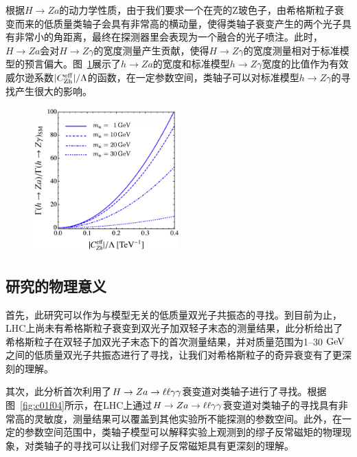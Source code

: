 根据$H\rightarrow Za$的动力学性质，由于我们要求一个在壳的Z玻色子，由希格斯粒子衰变而来的低质量类轴子会具有非常高的横动量，使得类轴子衰变产生的两个光子具有非常小的角距离，最终在探测器里会表现为一个融合的光子喷注。此时，$H\rightarrow Za$会对$H\rightarrow Z\gamma$的宽度测量产生贡献，使得$H\rightarrow Z\gamma$的宽度测量相对于标准模型的预言偏大。图~\ref{fig:c01f06}展示了$h \rightarrow Z a$的宽度和标准模型$h \rightarrow Z \gamma$宽度的比值作为有效威尔逊系数$|C_{\mathrm{Zh}}^{\mathrm{eff}}|/\Lambda$的函数，在一定参数空间，类轴子可以对标准模型$h \rightarrow Z \gamma$的寻找产生很大的影响。

\begin{figure}[!htbp]
    \centering
    \includegraphics[width=0.5\textwidth]{figures/chapter01/ALP_GammaRatio.jpg}
    \label{fig:c01f06}
\end{figure}

\subsection{研究的物理意义}

首先，此研究可以作为与模型无关的低质量双光子共振态的寻找。到目前为止，LHC上尚未有希格斯粒子衰变到双光子加双轻子末态的测量结果，此分析给出了希格斯粒子在双轻子加双光子末态下的首次测量结果，并对质量范围为1--30$\GeV$之间的低质量双光子共振态进行了寻找，让我们对希格斯粒子的奇异衰变有了更深刻的理解。

其次，此分析首次利用了$H\to Za\to\ell\ell\gamma\gamma$衰变道对类轴子进行了寻找。根据图~\ref{fig:c01f04}所示，在LHC上通过$H\to Za\to\ell\ell\gamma\gamma$衰变道对类轴子的寻找具有非常高的灵敏度，测量结果可以覆盖到其他实验所不能探测的参数空间。此外，在一定的参数空间范围中，类轴子模型可以解释实验上观测到的缪子反常磁矩的物理现象，对类轴子的寻找可以让我们对缪子反常磁矩具有更深刻的理解。


